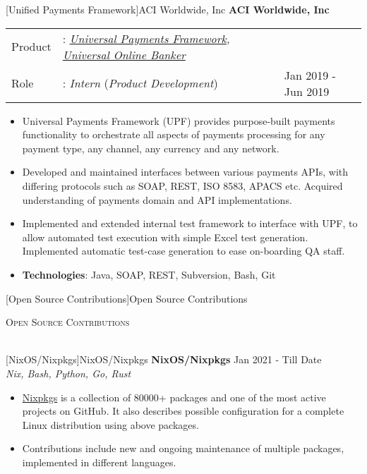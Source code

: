 \documentclass[a4paper]{article}
\newcommand{\lineunder} {
    \vspace*{-8pt} \\
    \hspace*{-18pt} \hrulefill \\
}
\newcommand{\header} [1] {
    {\hspace*{-18pt}\vspace*{6pt} \textsc{#1}}
    \vspace*{-6pt} \lineunder
}
\begin{document}
[Unified Payments Framework]{ACI Worldwide, Inc}
\textbf{ACI Worldwide, Inc} \\
\begin{tabularx}{\textwidth}{ l l>{\raggedleft\arraybackslash}X}
	Product & : \textit{\href{https://www.aciworldwide.com/solutions/payments-orchestration-platform}{Universal Payments Framework}, \href{https://dragonflyft.com/product}{Universal Online Banker}} &                     \\
	Role    & : \textit{Intern} (\textit{Product Development})                                                                                                                                        & Jan 2019 - Jun 2019 \\
\end{tabularx}
\begin{itemize} \itemsep 1pt
	\item Universal Payments Framework (UPF) provides purpose-built payments functionality to orchestrate all aspects of payments processing for any payment type, any channel, any currency and any network.
	\item Developed and maintained interfaces between various payments APIs, with differing protocols such as SOAP, REST, ISO 8583, APACS etc. Acquired understanding of payments domain and API implementations.
	\item Implemented and extended internal test framework to interface with UPF, to allow automated test execution with simple Excel test generation. Implemented automatic test-case generation to ease on-boarding QA staff.
	\item \textbf{Technologies}: Java, SOAP, REST, Subversion, Bash, Git
\end{itemize}
\vspace{1mm}

[Open Source Contributions]{Open Source Contributions}
\header{Open Source Contributions}
\vspace{1mm}

[NixOS/Nixpkgs]{NixOS/Nixpkgs}
{\textbf{NixOS/Nixpkgs}} \hfill Jan 2021 - Till Date \\
\textit{Nix, Bash, Python, Go, Rust} \\
\begin{itemize}
	\item \href{https://github.com/NixOS/nixpkgs/}{Nixpkgs} is a collection of 80000+ packages and one of the most active projects on GitHub. It also describes possible configuration for a complete Linux distribution using above packages.
	\item Contributions include new and ongoing maintenance of multiple packages, implemented in different languages.
\end{itemize}
\end{document}
